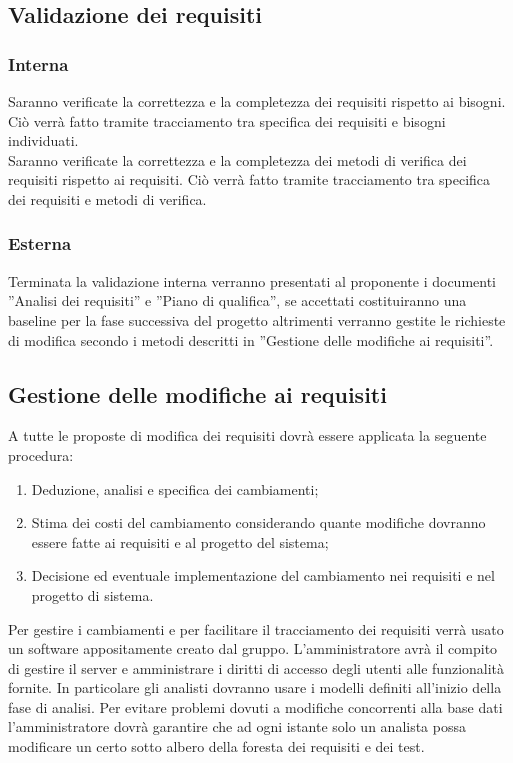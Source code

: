		\subsection{Validazione dei requisiti}{
			\subsubsection{Interna}{
				Saranno verificate la correttezza e la completezza dei requisiti rispetto ai bisogni. Ciò verrà fatto tramite tracciamento tra specifica dei requisiti e bisogni individuati.\\Saranno verificate la correttezza e la completezza dei metodi di verifica dei requisiti
				rispetto ai requisiti. Ciò verrà fatto tramite tracciamento tra specifica dei requisiti e metodi di verifica.
			}
				\subsubsection{Esterna}{
					Terminata la validazione interna verranno presentati al proponente i documenti ”Analisi dei requisiti” e ”Piano di qualifica”, se accettati costituiranno una baseline per la fase successiva del progetto altrimenti verranno gestite le richieste di modifica secondo i metodi descritti in ”Gestione delle modifiche ai requisiti”.
				}
		}
		\subsection{Gestione delle modifiche ai requisiti}{
			A tutte le proposte di modifica dei requisiti dovrà essere applicata la seguente procedura:
			\begin{enumerate}
				\item Deduzione, analisi e specifica dei cambiamenti;
				\item Stima dei costi del cambiamento considerando quante modifiche dovranno essere fatte ai requisiti\ped{g} e al progetto del sistema;
				\item Decisione ed eventuale implementazione del cambiamento nei requisiti\ped{g} e nel progetto di sistema.
			\end{enumerate}
			Per gestire i cambiamenti e per facilitare il tracciamento dei requisiti verrà usato un software appositamente creato dal gruppo. L’amministratore avrà il compito di gestire il server e amministrare i diritti di accesso degli utenti alle funzionalità fornite. In particolare gli analisti dovranno usare i modelli definiti all’inizio della fase di analisi. Per evitare problemi dovuti a modifiche concorrenti alla base dati l’amministratore dovrà garantire che ad ogni istante solo un analista possa modificare un certo sotto albero della foresta dei requisiti e dei test.
			}
			
